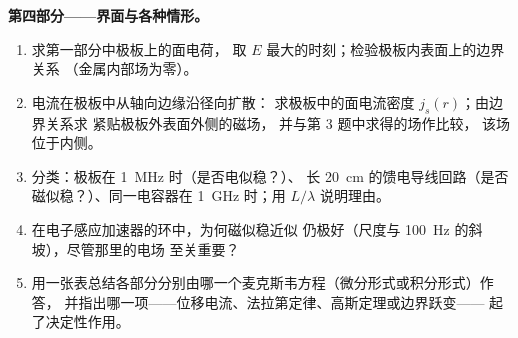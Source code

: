 \begin{problem}
\medskip
\noindent\textbf{第四部分——界面与各种情形。}
\begin{enumerate}[resume]
  \item 求第一部分中极板上的面电荷，
        取 $E$ 最大的时刻；检验极板内表面上的边界关系
        （金属内部场为零）。
  \item 电流在极板中从轴向边缘沿径向扩散：
        求极板中的面电流密度 $j_s(r)$；由边界关系求
        紧贴极板外表面外侧的磁场，
        并与第 3 题中求得的场作比较，
        该场位于内侧。
  \item 分类：极板在 \qty{1}{MHz} 时（是否电似稳？）、
        长 \qty{20}{cm} 的馈电导线回路（是否磁似稳？）、同一电容器在
        \qty{1}{GHz} 时；用 $L/\lambda$ 说明理由。
  \item 在电子感应加速器的环中，为何磁似稳近似
        仍极好（尺度与 \qty{100}{Hz} 的斜坡），尽管那里的电场
        至关重要？
  \item 用一张表总结各部分分别由哪一个麦克斯韦方程（微分形式或积分形式）作答，
        并指出哪一项——位移电流、法拉第定律、高斯定理或边界跃变——
        起了决定性作用。
\end{enumerate}
\end{problem}
